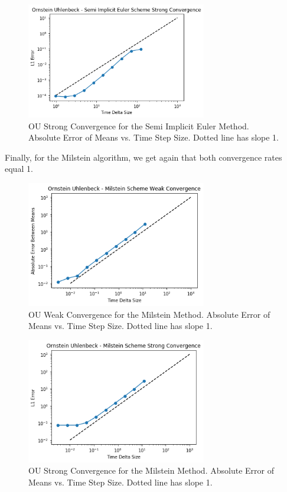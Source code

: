 \documentclass[onecolumn,notitlepage,pra,10pt,aps]{revtex4-1}
\begin{document}
  \begin{figure}[H]
    \centering
      \includegraphics[width=0.7\textwidth]{ou_strong_semi.png}
    \caption{OU Strong Convergence for the Semi Implicit Euler Method. Absolute Error of Means vs. Time Step Size. Dotted line has slope 1.}
  \end{figure}

  Finally, for the Milstein algorithm, we get again that both convergence rates equal 1.

  \begin{figure}[H]
    \centering
      \includegraphics[width=0.7\textwidth]{ou_weak_milstein.png}
    \caption{OU Weak Convergence for the Milstein Method. Absolute Error of Means vs. Time Step Size. Dotted line has slope 1.}
  \end{figure}

  \begin{figure}[H]
    \centering
      \includegraphics[width=0.7\textwidth]{ou_strong_milstein.png}
    \caption{OU Strong Convergence for the Milstein Method. Absolute Error of Means vs. Time Step Size. Dotted line has slope 1.}
  \end{figure}
\end{document}
